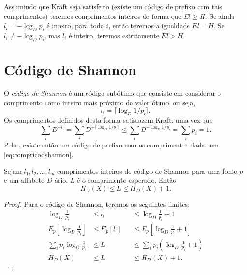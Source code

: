 Assumindo que Kraft seja satisfeito (existe um código de prefixo com tais comprimentos)
teremos comprimentos inteiros de forma que $E l \geq H$. Se ainda $l_i = -\log_D p_i$ é
inteiro, para todo $i$, então teremos a igualdade $E l = H$. 
Se $l_i \neq -\log_D p_i$, mas $l_i$ é inteiro, teremos estritamente $E l > H$.


\section{Código de Shannon}
O \emph{código de Shannon} é um código subótimo que consiste em considerar
o comprimento como inteiro mais próximo do valor ótimo, ou seja,
\begin{equation}\label{eq:compricodshannon}
  l_i = \lceil \log_D 1/p_i \rceil .
\end{equation}
Os comprimentos definidos desta forma satisfazem Kraft, uma vez que
\begin{equation}
  \sum_i D^{-l_i} = \sum_i D ^{- \lceil \log_D 1/p_i \rceil} \leq \sum_i D^{-\log_D 1/p_i} = \sum_i p_i = 1 .
\end{equation} 
Pelo , existe então um código de prefixo com os comprimentos dados em \ref{eq:compricodshannon}.

\begin{theorem}
  Sejam $l_1, l_2, \ldots, l_m$ comprimentos inteiros do código de Shannon para uma fonte $p$ e um
  alfabeto $D$-ário. $L$ é o comprimento esperado. Então
  \begin{equation}
   H_D(X) \leq L \leq H_D(X) + 1 .
  \end{equation}
\end{theorem}
\begin{proof}
Para o código de Shannon, teremos os seguintes limites:
\begin{subequations}\label{eq:limitescodshannon}
  \begin{alignat}{2}
	  \log_D \frac{1}{p_i} & \leq l_i && \leq \log_D \frac{1}{p_i} + 1 \\
	  E_p \left[ \log_D \frac{1}{p_i} \right]  & \leq E_p \left[ l_i \right] && \leq E_p \left[ \log_D \frac{1}{p_i} + 1 \right] \\
	  \sum_i p_i \log_D \frac{1}{p_i} & \leq L && \leq \sum_i p_i \left( \log_D \frac{1}{p_i} + 1 \right) \\
	  H_D(X) & \leq L && \leq H_D(X) + 1 .
  \end{alignat}
\end{subequations}
\end{proof}

